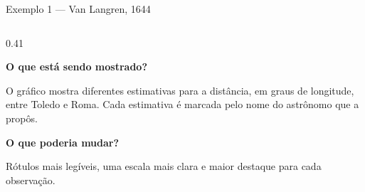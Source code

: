 \documentclass[aspectratio=169,11pt]{beamer}
\begin{document}
\begin{frame}{Exemplo 1 — Van Langren, 1644}
\begin{columns}[T,onlytextwidth]
\begin{column}{0.41\textwidth}
            \vspace{0.30cm}


            {\small
            \color{AzulEscuro}
            \textbf{O que está sendo mostrado?}}

            \vspace{0.12cm}

            {\footnotesize
            O gráfico mostra diferentes estimativas para a distância, em graus de longitude, entre Toledo e Roma. Cada estimativa é marcada pelo nome do astrônomo que a propôs.
            }

            \vspace{0.32cm}
            

            {\small
            \color{AzulEscuro}
            \textbf{O que poderia mudar?}}

            \vspace{0.12cm}

            {\footnotesize
            Rótulos mais legíveis, uma escala mais clara
            e maior destaque para cada observação.
            }

        \end{column}

    \end{columns}

\end{frame}
\end{document}
